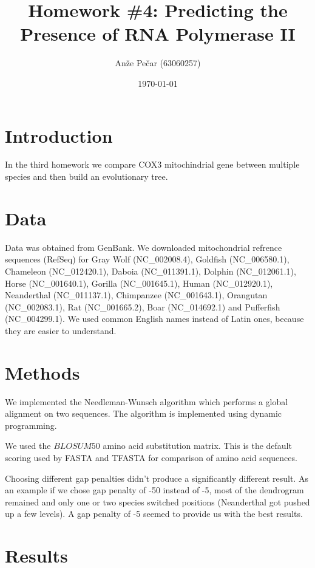\documentclass[a4paper,11pt]{article}
\title{Homework \#4: Predicting the Presence of RNA Polymerase II}
\author{Anže Pečar (63060257)}
\date{\today}
\begin{document}
\maketitle

\section{Introduction}

In the third homework we compare COX3 mitochindrial gene between multiple species and then build an evolutionary tree.

\section{Data}

Data was obtained from GenBank. We downloaded mitochondrial refrence sequences (RefSeq) for Gray Wolf (NC\_002008.4), Goldfish (NC\_006580.1), Chameleon (NC\_012420.1), Daboia (NC\_011391.1), Dolphin (NC\_012061.1), Horse (NC\_001640.1), Gorilla (NC\_001645.1), Human (NC\_012920.1), Neanderthal (NC\_011137.1), Chimpanzee (NC\_001643.1), Orangutan (NC\_002083.1), Rat (NC\_001665.2), Boar (NC\_014692.1) and Pufferfish (NC\_004299.1). We used common English names instead of Latin ones, because they are easier to understand.


\section{Methods}

We implemented the Needleman-Wunsch algorithm which performs a global alignment on two sequences. The algorithm is implemented using dynamic programming. 

We used the $BLOSUM50$ amino acid substitution matrix. This is the default scoring used by FASTA and TFASTA for comparison of amino acid sequences.

Choosing different gap penalties didn't produce a significantly different result. As an example if we chose gap penalty of -50 instead of -5, most of the dendrogram remained and only one or two species switched positions (Neanderthal got pushed up a few levels). A gap penalty of -5 seemed to provide us with the best results.
\section{Results}
\end{document}
